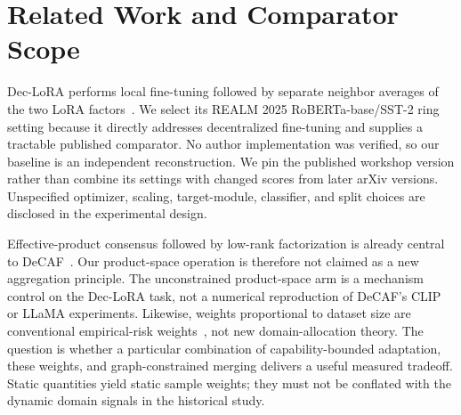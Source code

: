 \documentclass[11pt]{article}
\begin{document}
\section{Related Work and Comparator Scope}
Dec-LoRA performs local fine-tuning followed by separate neighbor averages of the two LoRA factors~\citep{ghiasvand2025declora}. We select its REALM 2025 RoBERTa-base/SST-2 ring setting because it directly addresses decentralized fine-tuning and supplies a tractable published comparator. No author implementation was verified, so our baseline is an independent reconstruction. We pin the published workshop version rather than combine its settings with changed scores from later arXiv versions. Unspecified optimizer, scaling, target-module, classifier, and split choices are disclosed in the experimental design.

Effective-product consensus followed by low-rank factorization is already central to DeCAF~\citep{saadati2025decaf}. Our product-space operation is therefore not claimed as a new aggregation principle. The unconstrained product-space arm is a mechanism control on the Dec-LoRA task, not a numerical reproduction of DeCAF's CLIP or LLaMA experiments. Likewise, weights proportional to dataset size are conventional empirical-risk weights~\citep{mcmahan2017fedavg}, not new domain-allocation theory. The question is whether a particular combination of capability-bounded adaptation, these weights, and graph-constrained merging delivers a useful measured tradeoff. Static quantities yield static sample weights; they must not be conflated with the dynamic domain signals in the historical study.
\end{document}
